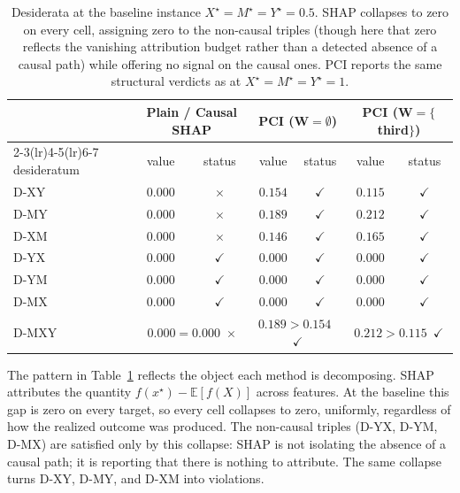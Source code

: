 \begin{table}[ht]
\centering
\small
\begin{tabular}{lcccccc}
\toprule
& \multicolumn{2}{c}{Plain / Causal SHAP} & \multicolumn{2}{c}{PCI ($\mathbf{W}=\emptyset$)} & \multicolumn{2}{c}{PCI ($\mathbf{W}=\{$third$\}$)} \\
\cmidrule(lr){2-3}\cmidrule(lr){4-5}\cmidrule(lr){6-7}
desideratum & value & status & value & status & value & status \\
\midrule
D-XY & $0.000$ & $\times$ & $0.154$ & $\checkmark$ & $0.115$ & $\checkmark$ \\
D-MY & $0.000$ & $\times$ & $0.189$ & $\checkmark$ & $0.212$ & $\checkmark$ \\
D-XM & $0.000$ & $\times$ & $0.146$ & $\checkmark$ & $0.165$ & $\checkmark$ \\
D-YX & $0.000$ & $\checkmark$ & $0.000$ & $\checkmark$ & $0.000$ & $\checkmark$ \\
D-YM & $0.000$ & $\checkmark$ & $0.000$ & $\checkmark$ & $0.000$ & $\checkmark$ \\
D-MX & $0.000$ & $\checkmark$ & $0.000$ & $\checkmark$ & $0.000$ & $\checkmark$ \\
\midrule
D-MXY & \multicolumn{2}{c}{$0.000=0.000$~$\times$} & \multicolumn{2}{c}{$0.189>0.154$~$\checkmark$} & \multicolumn{2}{c}{$0.212>0.115$~$\checkmark$} \\
\bottomrule
\end{tabular}
\caption{Desiderata at the baseline instance $X^\star=M^\star=Y^\star=0.5$.
SHAP collapses to zero on every cell, assigning zero to the
non-causal triples (though here that zero reflects the vanishing attribution
budget rather than a detected absence of a causal path) while offering no
signal on the causal ones. PCI reports the same structural verdicts as at $X^\star=M^\star=Y^\star=1$.}
\label{tab:signal_desid_baseline}
\end{table}

The pattern in Table~\ref{tab:signal_desid_baseline} reflects the object each
method is decomposing. SHAP attributes the quantity
$f(x^\star)-\mathbb{E}[f(X)]$ across features. At the baseline this gap is
zero on every target, so every cell collapses to zero, uniformly, regardless
of how the realized outcome was produced. The non-causal triples (D-YX, D-YM, D-MX) are satisfied only
by this collapse: SHAP is not isolating the absence of a causal path; it is
reporting that there is nothing to attribute. The same collapse turns D-XY,
D-MY, and D-XM into violations.

